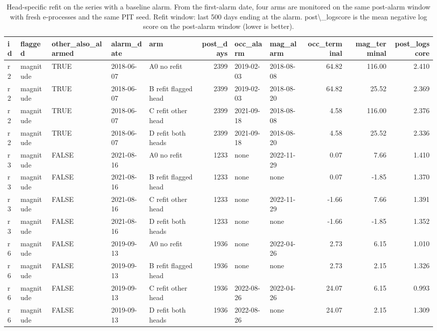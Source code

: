 \begin{table}

\caption{Head-specific refit on the series with a baseline alarm. From the first-alarm date, four arms are monitored on the same post-alarm window with fresh e-processes and the same PIT seed. Refit window: last 500 days ending at the alarm. post\textbackslash{}\_logscore is the mean negative log score on the post-alarm window (lower is better).}
\centering
\begin{tabular}[t]{lllllrllrrr}
\toprule
id & flagged & other\_also\_alarmed & alarm\_date & arm & post\_days & occ\_alarm & mag\_alarm & occ\_terminal & mag\_terminal & post\_logscore\\
\midrule
r2 & magnitude & TRUE & 2018-06-07 & A0 no refit & 2399 & 2019-02-03 & 2018-08-08 & 64.82 & 116.00 & 2.410\\
r2 & magnitude & TRUE & 2018-06-07 & B refit flagged head & 2399 & 2019-02-03 & 2018-08-20 & 64.82 & 25.52 & 2.369\\
r2 & magnitude & TRUE & 2018-06-07 & C refit other head & 2399 & 2021-09-18 & 2018-08-08 & 4.58 & 116.00 & 2.376\\
r2 & magnitude & TRUE & 2018-06-07 & D refit both heads & 2399 & 2021-09-18 & 2018-08-20 & 4.58 & 25.52 & 2.336\\
r3 & magnitude & FALSE & 2021-08-16 & A0 no refit & 1233 & none & 2022-11-29 & 0.07 & 7.66 & 1.410\\
\addlinespace
r3 & magnitude & FALSE & 2021-08-16 & B refit flagged head & 1233 & none & none & 0.07 & -1.85 & 1.370\\
r3 & magnitude & FALSE & 2021-08-16 & C refit other head & 1233 & none & 2022-11-29 & -1.66 & 7.66 & 1.391\\
r3 & magnitude & FALSE & 2021-08-16 & D refit both heads & 1233 & none & none & -1.66 & -1.85 & 1.352\\
r6 & magnitude & FALSE & 2019-09-13 & A0 no refit & 1936 & none & 2022-04-26 & 2.73 & 6.15 & 1.010\\
r6 & magnitude & FALSE & 2019-09-13 & B refit flagged head & 1936 & none & none & 2.73 & 2.15 & 1.326\\
\addlinespace
r6 & magnitude & FALSE & 2019-09-13 & C refit other head & 1936 & 2022-08-26 & 2022-04-26 & 24.07 & 6.15 & 0.993\\
r6 & magnitude & FALSE & 2019-09-13 & D refit both heads & 1936 & 2022-08-26 & none & 24.07 & 2.15 & 1.309\\
\bottomrule
\end{tabular}
\end{table}
